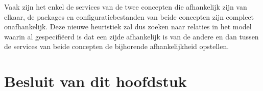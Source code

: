 Vaak zijn het enkel de services van de twee concepten die afhankelijk zijn van elkaar, de packages en configuratiebestanden van beide concepten zijn compleet onafhankelijk.
Deze nieuwe heuristiek zal dus zoeken naar relaties in het model waarin al gespecifi\"eerd is dat een zijde afhankelijk is van de andere en dan tussen de services van beide concepten de bijhorende afhankelijkheid opstellen.
\section{Besluit van dit hoofdstuk}
